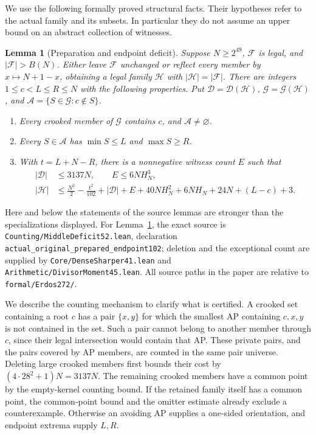 \documentclass[11pt,a4paper]{article}
\newtheorem{lemma}[theorem]{Lemma}
\theoremstyle{definition}\newtheorem{definition}[theorem]{Definition}
\newcommand{\F}{\mathcal F}
\newcommand{\G}{\mathcal G}
\newcommand{\D}{\mathcal D}
\newcommand{\A}{\mathcal A}
\newcommand{\Hh}{\mathcal H}
\newcommand{\code}[1]{{\small\nolinkurl{#1}}}
\begin{document}
We use the following formally proved structural facts. Their hypotheses
refer to the actual family and its subsets. In particular they do not
assume an upper bound on an abstract collection of witnesses.

\begin{lemma}[Preparation and endpoint deficit]\label{lem:prepare}
Suppose $N\ge2^{49}$, $\F$ is legal, and $|\F|>B(N)$.
Either leave $\F$ unchanged or reflect every member by $x\mapsto N+1-x$,
obtaining a legal family $\Hh$ with $|\Hh|=|\F|$.
There are integers $1\le c<L\le R\le N$ with the following properties.
Put $\D=\D(\Hh)$, $\G=\G(\Hh)$, and
$\A=\{S\in\G:c\notin S\}$.
\begin{enumerate}
\item Every crooked member of $\G$ contains $c$, and $\A\ne\varnothing$.
\item Every $S\in\A$ has $\min S\le L$ and $\max S\ge R$.
\item With $t=L+N-R$, there is a nonnegative witness count $E$ such that
\begin{align}
 |\D|&\le3137N,\qquad E\le6NH_N^3,\label{eq:deletion}\\
 |\Hh|&\le\frac{N^2}{2}-\frac{t^2}{102}
  +|\D|+E+40NH_N^2+6NH_N+24N+(L-c)+3.
  \label{eq:deficit}
\end{align}
\end{enumerate}
\end{lemma}

Here and below the statements of the source lemmas are stronger than the
specializations displayed. For Lemma~\ref{lem:prepare}, the exact source
is \code{Counting/MiddleDeficit52.lean}, declaration
\code{actual_original_prepared_endpoint102}; deletion and the exceptional
count are supplied by \code{Core/DenseSharper41.lean} and
\code{Arithmetic/DivisorMoment45.lean}.
All source paths in the paper are relative to
\code{formal/Erdos272/}.

We describe the counting mechanism to clarify what is certified. A crooked
set containing a root $c$ has a pair $\{x,y\}$ for which the smallest AP
containing $c,x,y$ is not contained in the set. Such a pair cannot belong
to another member through $c$, since their legal intersection would
contain that AP. These private pairs, and the pairs covered by AP
members, are counted in the same pair universe. Deleting large crooked
members first bounds their cost by $(4\cdot28^2+1)N=3137N$.
The remaining crooked members have a common point by the empty-kernel
counting bound. If the retained family itself has a common point, the
common-point bound and the omitter estimate already exclude a
counterexample. Otherwise an avoiding AP supplies a one-sided
orientation, and endpoint extrema supply $L,R$.
\end{document}
